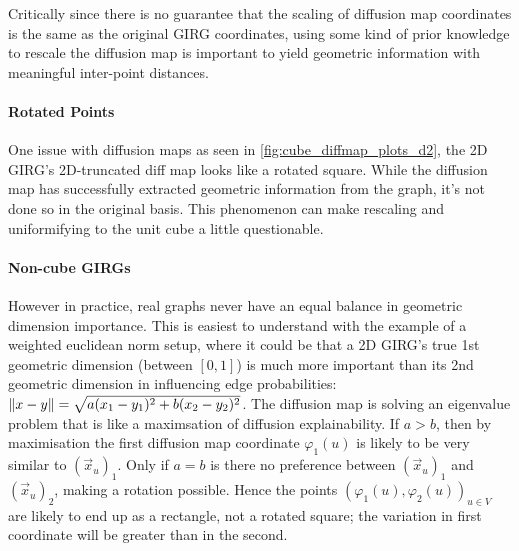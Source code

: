 
Critically since there is no guarantee that the scaling of diffusion map coordinates is the same as the original GIRG coordinates, using some kind of prior knowledge to rescale the diffusion map is important to yield geometric information with meaningful inter-point distances.

\paragraph{Rotated Points} One issue with diffusion maps as seen in \cref{fig:cube_diffmap_plots_d2}, the 2D GIRG's 2D-truncated diff map looks like a rotated square. While the diffusion map has successfully extracted geometric information from the graph, it's not done so in the original basis. This phenomenon can make rescaling and uniformifying to the unit cube a little questionable.

\paragraph{Non-cube GIRGs} However in practice, real graphs never have an equal balance in geometric dimension importance. This is easiest to understand with the example of a weighted euclidean norm setup, where it could be that a 2D GIRG's true 1st geometric dimension (between $[0, 1]$) is much more important than its 2nd geometric dimension in influencing edge probabilities: $\left\lVert x - y\right\rVert = \sqrt{a (x_1 - y_1)^2 + b(x_2 - y_2)^2}$.
The diffusion map is solving an eigenvalue problem that is like a maximsation of diffusion explainability. If $a > b$, then by maximisation the first diffusion map coordinate $\varphi_1(u)$ is likely to be very similar to $(\vec{x}_u)_1$. Only if $a=b$ is there no preference between $(\vec{x}_u)_1$ and $(\vec{x}_u)_2$, making a rotation possible.
Hence the points $(\varphi_1(u), \varphi_2(u))_{u \in V}$ are likely to end up as a rectangle, not a rotated square; the variation in first coordinate will be greater than in the second.

